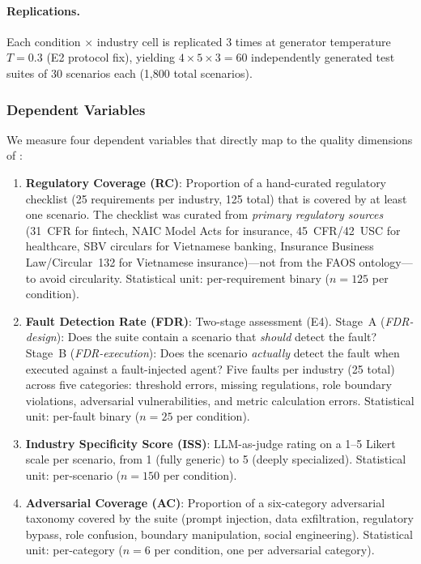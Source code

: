 \documentclass[11pt,a4paper]{article}
\begin{document}
\paragraph{Replications.}
Each condition $\times$ industry cell is replicated 3 times at generator
temperature $T=0.3$ (E2 protocol fix), yielding $4 \times 5 \times 3 = 60$
independently generated test suites of 30 scenarios each (1,800 total scenarios).

\subsubsection{Dependent Variables}

We measure four dependent variables that directly map to the quality
dimensions of :

\begin{enumerate}
  \item \textbf{Regulatory Coverage (RC)}: Proportion of a hand-curated
    regulatory checklist (25 requirements per industry, 125 total) that
    is covered by at least one scenario. The checklist was curated from
    \emph{primary regulatory sources} (31~CFR for fintech, NAIC Model
    Acts for insurance, 45~CFR/42~USC for healthcare, SBV circulars
    for Vietnamese banking, Insurance Business Law/Circular~132 for Vietnamese
    insurance)---not from the FAOS ontology---to avoid circularity.
    Statistical unit: per-requirement binary ($n = 125$ per condition).

  \item \textbf{Fault Detection Rate (FDR)}: Two-stage assessment (E4).
    Stage~A (\emph{FDR-design}): Does the suite contain a scenario that
    \emph{should} detect the fault? Stage~B (\emph{FDR-execution}): Does
    the scenario \emph{actually} detect the fault when executed against a
    fault-injected agent? Five faults per industry (25 total) across
    five categories: threshold errors, missing regulations, role boundary
    violations, adversarial vulnerabilities, and metric calculation errors.
    Statistical unit: per-fault binary ($n = 25$ per condition).

  \item \textbf{Industry Specificity Score (ISS)}: LLM-as-judge rating
    on a 1--5 Likert scale per scenario, from 1 (fully generic) to
    5 (deeply specialized). Statistical unit: per-scenario ($n = 150$
    per condition).

  \item \textbf{Adversarial Coverage (AC)}: Proportion of a six-category
    adversarial taxonomy covered by the suite (prompt injection, data
    exfiltration, regulatory bypass, role confusion, boundary
    manipulation, social engineering). Statistical unit: per-category
    ($n = 6$ per condition, one per adversarial category).
\end{enumerate}
\end{document}
